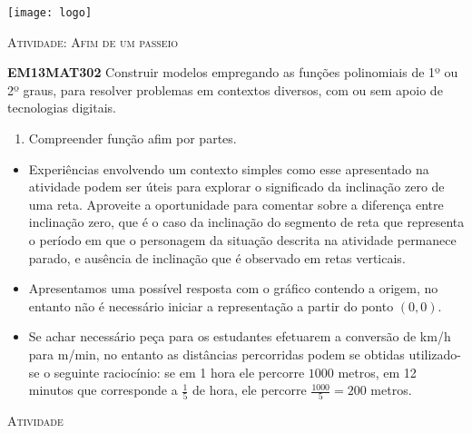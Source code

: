\documentclass[10 pt,usenames,dvipsnames, oneside]{article}
\begin{document}
\begin{center}
  \begin{minipage}[l]{3cm}
\texttt{[image: logo]}    
\end{minipage}\hfill
\begin{minipage}[r]{.8\textwidth}
 {\Large \scshape Atividade: Afim de um passeio}  
\end{minipage}
\end{center}
\vspace{.2cm}

\ifdefined\prof
\begin{objetivos}
\item \textbf{EM13MAT302} Construir modelos empregando as funções polinomiais de 1º ou 2º graus, para resolver problemas em contextos diversos, com ou sem apoio de tecnologias digitais.
\end{objetivos}

\begin{goals}
\begin{enumerate}
\item Compreender função afim por partes.
\end{enumerate}

\tcblower

\begin{itemize}
\item Experiências envolvendo um contexto simples como esse apresentado na atividade podem ser úteis para explorar o significado da inclinação zero de uma reta. Aproveite a oportunidade para comentar sobre a diferença entre inclinação zero, que é o caso da inclinação do segmento de reta que representa o período em que o personagem da situação descrita na atividade permanece parado, e ausência de inclinação que é observado em retas verticais.
\item Apresentamos uma possível resposta com o gráfico contendo a origem, no entanto não é necessário iniciar a representação a partir do ponto $(0,0)$.
\item Se achar necessário peça para os estudantes efetuarem a conversão de km/h para m/min, no entanto as distâncias percorridas podem se obtidas utilizado-se o seguinte raciocínio: se em 1 hora ele percorre $1000$ metros, em 12 minutos que corresponde a $\displaystyle\frac{1}{5}$ de hora, ele percorre $\displaystyle\frac{1000}{5}=200$ metros.
\end{itemize}
\end{goals}

\bigskip
\begin{center}
{\large \scshape Atividade}
\end{center}
\fi
\end{document}
